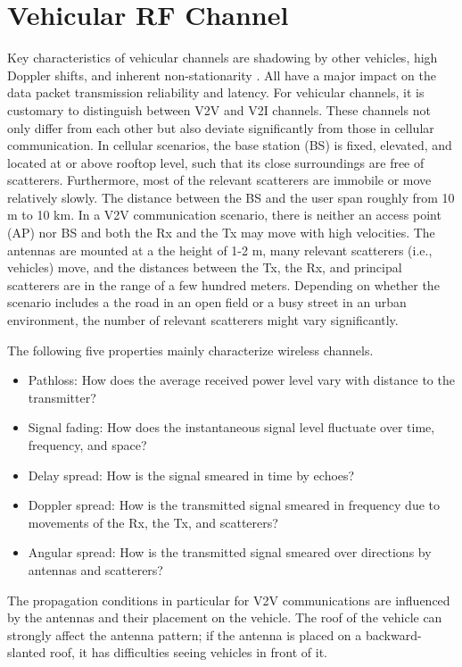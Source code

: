 \section{Vehicular RF Channel} 
Key characteristics of vehicular channels are shadowing by other vehicles, high Doppler shifts, and inherent non-stationarity \cite{mecklenbrauker2011vehicular}. All have a major impact on the data packet transmission reliability and latency. For vehicular channels, it is customary to distinguish between V2V and V2I channels. These channels not only
differ from each other but also deviate significantly from those in cellular communication. In cellular scenarios, the base station (BS) is fixed, elevated, and located at or above rooftop level, such that its close surroundings are free of scatterers. Furthermore, most of the relevant scatterers are
immobile or move relatively slowly. The distance between the BS and the user span roughly from 10 m to 10 km. In a V2V communication scenario, there is neither an access point (AP) nor BS and both the Rx and the Tx may move with high velocities. The antennas are mounted at a the height of 1-2 m, many relevant scatterers (i.e., vehicles) move, and the distances between the Tx, the Rx, and principal scatterers are in the range of a few hundred meters. Depending on whether the scenario includes a the road in an open field or a busy street in an urban environment, the number of relevant scatterers might vary significantly.

The following five properties mainly characterize wireless channels.
\begin{itemize}
    \item Pathloss: How does the average received power level vary with distance to the transmitter?
    \item Signal fading: How does the instantaneous signal level fluctuate over time, frequency, and space?
    \item Delay spread: How is the signal smeared in time by echoes?
    \item Doppler spread: How is the transmitted signal smeared in frequency due to movements of the Rx, the Tx, and scatterers?
    \item Angular spread: How is the transmitted signal smeared over directions by antennas and scatterers?
\end{itemize}

The propagation conditions in particular for V2V communications
are influenced by the antennas and their placement on the vehicle. The roof of the vehicle can strongly affect the antenna pattern; if the antenna is placed on a backward-slanted roof, it has difficulties seeing vehicles in front of it.

